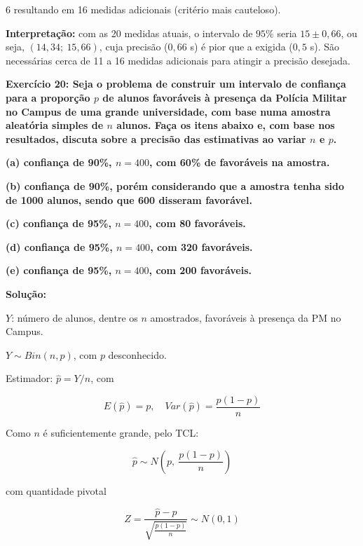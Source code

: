 \documentclass[8pt, a4paper, landscape]{extarticle}
\begin{document}
\begin{multicols}{6}
resultando em 16 medidas adicionais (critério mais cauteloso).

\textbf{Interpretação:} com as 20 medidas atuais, o intervalo de $95\%$ seria $15 \pm 0,66$, ou seja, $(14,34;\ 15,66)$, cuja precisão ($0,66$ s) é pior que a exigida ($0,5$ s). São necessárias cerca de 11 a 16 medidas adicionais para atingir a precisão desejada.

\textbf{Exercício 20: Seja o problema de construir um intervalo de confiança para a proporção $p$ de alunos favoráveis à presença da Polícia Militar no Campus de uma grande universidade, com base numa amostra aleatória simples de $n$ alunos. Faça os itens abaixo e, com base nos resultados, discuta sobre a precisão das estimativas ao variar $n$ e $p$.}

\textbf{(a) confiança de 90\%, $n = 400$, com 60\% de favoráveis na amostra.}

\textbf{(b) confiança de 90\%, porém considerando que a amostra tenha sido de 1000 alunos, sendo que 600 disseram favorável.}

\textbf{(c) confiança de 95\%, $n = 400$, com 80 favoráveis.}

\textbf{(d) confiança de 95\%, $n = 400$, com 320 favoráveis.}

\textbf{(e) confiança de 95\%, $n = 400$, com 200 favoráveis.}

\vspace{0.3cm}

\textbf{Solução:}

$Y$: número de alunos, dentre os $n$ amostrados, favoráveis à presença da PM no Campus.

$Y \sim Bin(n, p)$, com $p$ desconhecido.

Estimador: $\hat{p} = Y/n$, com

\begin{equation*}
E(\hat{p}) = p, \quad Var(\hat{p}) = \frac{p(1-p)}{n}
\end{equation*}

Como $n$ é suficientemente grande, pelo TCL:

\begin{equation*}
\hat{p} \sim N\left(p,\ \frac{p(1-p)}{n}\right)
\end{equation*}

com quantidade pivotal

\begin{equation*}
Z = \frac{\hat{p} - p}{\sqrt{\frac{p(1-p)}{n}}} \sim N(0,1)
\end{equation*}


\end{multicols}
\end{document}
